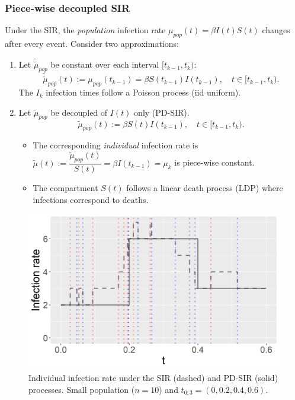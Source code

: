 \documentclass{beamer}
\begin{document}
\begin{frame} \frametitle{Piece-wise decoupled SIR}
	
	Under the SIR, the \textit{population} infection rate $\mu_{pop}(t) = \beta I(t) S(t)$ changes after every event. Consider two approximations:
	\begin{enumerate}
		\item Let $\tilde{\tilde{\mu}}_{pop}$ be constant over each interval $[t_{k-1}, t_k)$:
		$$\tilde{\tilde{\mu}}_{pop}(t) := \mu_{pop}(t_{k-1}) = \beta S(t_{k-1})I(t_{k - 1}), \quad t \in [t_{k - 1}, t_k).$$
		The $I_k$ infection times follow a Poisson process (iid uniform).
		
		\item Let $\tilde{\mu}_{pop}$ be decoupled of $I(t)$ only (PD-SIR).
		$$\tilde{\mu}_{pop}(t) := \beta S(t)I(t_{k - 1}), \quad t \in [t_{k - 1}, t_k).$$
		\begin{itemize}
			\item The corresponding \textit{individual} infection rate is $\tilde{\mu}(t) :=\dfrac{\tilde{\mu}_{pop}(t)}{S(t)} = \beta I(t_{k - 1}) = \mu_k$ is piece-wise constant.
			\item The compartment $S(t)$ follows a linear death process (LDP) where infections correspond to deaths.
		\end{itemize}
	\end{enumerate}
	
\end{frame}


\begin{frame}
	
	\begin{figure}
		\centering
		\includegraphics[scale = 0.4]{infection_rate_SIR_PDSIR}
		\caption{Individual infection rate under the SIR (dashed) and PD-SIR (solid) processes. Small population ($n = 10$) and $t_{0:3} = (0, 0.2, 0.4, 0.6)$.}
	\end{figure}			
\end{frame}
\end{document}
